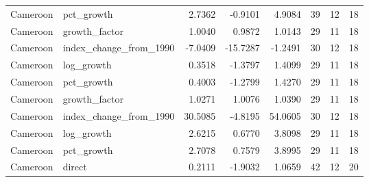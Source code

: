 \begin{table}
\begin{tabular}[t]{llrrrrrr}
Cameroon & pct\_growth & 2.7362 & -0.9101 & 4.9084 & 39 & 12 & 18\\
Cameroon & growth\_factor & 1.0040 & 0.9872 & 1.0143 & 29 & 11 & 18\\
\addlinespace
Cameroon & index\_change\_from\_1990 & -7.0409 & -15.7287 & -1.2491 & 30 & 12 & 18\\
Cameroon & log\_growth & 0.3518 & -1.3797 & 1.4099 & 29 & 11 & 18\\
Cameroon & pct\_growth & 0.4003 & -1.2799 & 1.4270 & 29 & 11 & 18\\
Cameroon & growth\_factor & 1.0271 & 1.0076 & 1.0390 & 29 & 11 & 18\\
Cameroon & index\_change\_from\_1990 & 30.5085 & -4.8195 & 54.0605 & 30 & 12 & 18\\
\addlinespace
Cameroon & log\_growth & 2.6215 & 0.6770 & 3.8098 & 29 & 11 & 18\\
Cameroon & pct\_growth & 2.7078 & 0.7579 & 3.8995 & 29 & 11 & 18\\
Cameroon & direct & 0.2111 & -1.9032 & 1.0659 & 42 & 12 & 20\\
\bottomrule
\end{tabular}
\end{table}